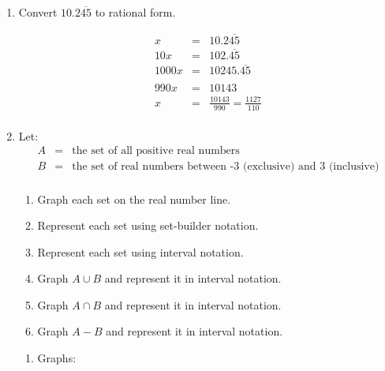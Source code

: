 \documentclass[letterpaper,12pt,fleqn]{article}
\begin{document}
\begin{enumerate}
\bigskip

\item Convert $10.2\overline{45}$ to rational form.

\bigskip

\begin{eqnarray*}
x &=& 10.2\overline{45} \\
10x &=& 102.\overline{45} \\
1000x &=& 10245.\overline{45} \\
\\
990x &=& 10143 \\
x &=& \frac{10143}{990}=\frac{1127}{110} \\
\end{eqnarray*}

\bigskip

\item Let:
\begin{eqnarray*}
A &=& \mbox{the set of all positive real numbers} \\
B &=& \mbox{the set of real numbers between -3 (exclusive) and 3 (inclusive)} \\
\end{eqnarray*}
\begin{enumerate}
\item Graph each set on the real number line.
\item Represent each set using set-builder notation.
\item Represent each set using interval notation.
\item Graph $A\cup B$ and represent it in interval notation.
\item Graph $A\cap B$ and represent it in interval notation.
\item Graph $A-B$ and represent it in interval notation.
\end{enumerate}

\bigskip

\newcommand{\tick}[1]{\draw (#1,0.1) -- (#1,-0.1)}
\newcommand{\ocirc}[1]{\draw (#1,0) circle [radius=0.1]}
\newcommand{\ccirc}[1]{\draw [fill=black] (#1,0) circle [radius=0.1]}

\begin{enumerate}
\item Graphs:



\end{enumerate}
\end{enumerate}
\end{document}
